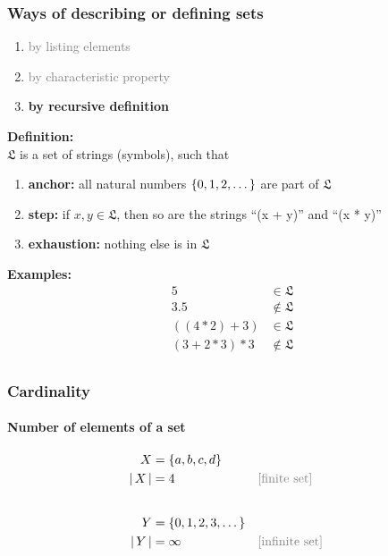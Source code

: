 \documentclass[fleqn,10pt,serif,xcolor=svgnames,xcolor=table,aspectratio=169,handout]{beamer}
\newcommand{\mygray}[1]{\textcolor{gray}{#1}}
\begin{document}
\begin{frame}

  \frametitle{Ways of describing or defining sets}

  \begin{minipage}{0.4\linewidth}
    \begin{enumerate}
      \item \mygray{by listing elements}
      \item \mygray{by characteristic property}
      \item \textbf{by recursive definition}
    \end{enumerate}
  \end{minipage}
  \hfill
  \begin{minipage}{0.45\linewidth}

    \textbf{Definition:}\\
    $\mathfrak{L}$ is a set of strings (symbols), such that
    \begin{enumerate}
      \item \textbf{anchor:} all natural numbers $\left\{0, 1, 2, \dots\right\}$ are part of $\mathfrak{L}$
      \item \textbf{step:} if $x, y \in \mathfrak{L}$, then so are the strings ``(x + y)'' and ``(x * y)''
      \item \textbf{exhaustion:} nothing else is in $\mathfrak{L}$
    \end{enumerate}

    \bigskip

\textbf{Examples:}
\begin{align*}
  5 &\in \mathfrak{L} \\
  3.5 &\not \in \mathfrak{L} \\
  ((4 * 2) + 3) &\in \mathfrak{L} \\
  (3 + 2 * 3) * 3 & \not \in \mathfrak{L} \\
\end{align*}
  \end{minipage}

\end{frame}

\begin{frame}
  \frametitle{Cardinality}
  \framesubtitle{Number of elements of a set}

  \begin{align*}
    X & = \set{a, b, c, d} \\
    \card{X} &= 4 && \text{\mygray{[finite set]}} \\ \noalign{\vskip20pt}
    Y &= \set{0, 1, 2, 3, \dots} \\
    \card{Y} &= \infty && \text{\mygray{[infinite set]}}
  \end{align*}

\end{frame}
\end{document}
